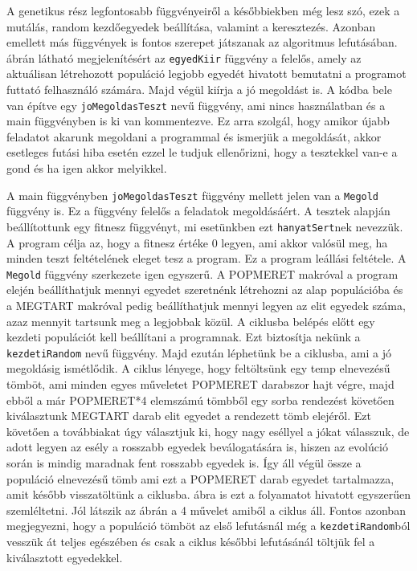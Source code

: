 \documentclass[12pt,a4paper,oneside]{report}
\begin{document}
		
		A genetikus rész legfontosabb függvényeiről a későbbiekben még lesz szó, ezek a mutálás, random kezdőegyedek beállítása, valamint a keresztezés.
		Azonban emellett más függvények is fontos szerepet játszanak az algoritmus lefutásában.
		 ábrán látható megjelenítésért az \texttt{egyedKiir} függvény a felelős, amely az aktuálisan létrehozott populáció legjobb egyedét hivatott bemutatni a programot futtató felhasználó számára.
		Majd végül kiírja a jó megoldást is.
		A kódba bele van építve egy \texttt{joMegoldasTeszt} nevű függvény, ami nincs használatban és a main függvényben is ki van kommentezve.
		Ez arra szolgál, hogy amikor újabb feladatot akarunk megoldani a programmal és ismerjük a megoldását, akkor esetleges futási hiba esetén ezzel le tudjuk ellenőrizni, hogy a tesztekkel van-e a gond és ha igen akkor melyikkel.
		
		
		A main függvényben \texttt{joMegoldasTeszt} függvény mellett jelen van a \texttt{Megold} függvény is.
		Ez a függvény felelős a feladatok megoldásáért.
		A tesztek alapján beállítottunk egy fitnesz függvényt, mi esetünkben ezt \texttt{hanyatSert}nek nevezzük.
		A program célja az, hogy a fitnesz értéke 0 legyen, ami akkor valósül meg, ha minden teszt feltételének eleget tesz a program.
		Ez a program leállási feltétele.
		A \texttt{Megold} függvény szerkezete igen egyszerű.
		A POPMERET makróval a program elején beállíthatjuk mennyi egyedet szeretnénk létrehozni az alap populációba és a MEGTART makróval pedig beállíthatjuk mennyi legyen az elit egyedek száma, azaz mennyit tartsunk meg a legjobbak közül.
		A ciklusba belépés előtt egy kezdeti populációt kell beállítani a programnak.
		Ezt biztosítja nekünk a \texttt{kezdetiRandom} nevű függvény.
		Majd ezután léphetünk be a ciklusba, ami a jó megoldásig ismétlődik.
		A ciklus lényege, hogy feltöltsünk egy temp elnevezésű tömböt, ami minden egyes műveletet POPMERET darabszor hajt végre, majd ebből a már POPMERET*4 elemszámú tömbből egy sorba rendezést követően kiválasztunk MEGTART darab elit egyedet a rendezett tömb elejéről.
		Ezt követően a továbbiakat úgy választjuk ki, hogy nagy eséllyel a jókat válasszuk, de adott legyen az esély a rosszabb egyedek beválogatására is, hiszen az evolúció során is mindig maradnak fent rosszabb egyedek is.
		Így áll végül össze a populáció elnevezésű tömb ami ezt a POPMERET darab egyedet tartalmazza, amit később visszatöltünk a ciklusba.
		 ábra is ezt a folyamatot hivatott egyszerűen szemléltetni. Jól látszik az ábrán a 4 művelet amiből a ciklus áll. Fontos azonban megjegyezni, hogy a populáció tömböt az első lefutásnál még a \texttt{kezdetiRandom}ból vesszük át teljes egészében és csak a ciklus későbbi lefutásánál töltjük fel a kiválasztott egyedekkel.
\end{document}
